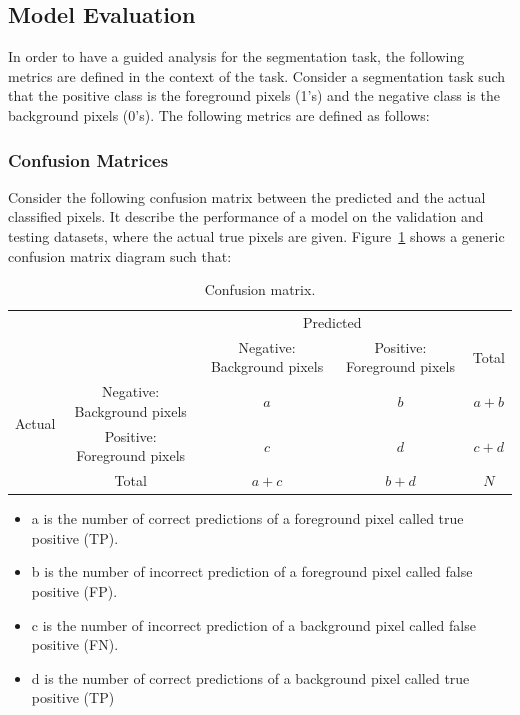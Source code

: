 \documentclass{WitsPhysicsReport}
\begin{document}
\subsection{Model Evaluation}
\label{sec:model_evaluation_and_optimization}
 In order to have a guided analysis for the segmentation task, the following metrics are defined in the context of the task. Consider a segmentation task such that the positive class is the foreground pixels (1's) and the negative class is the background pixels (0's). The following metrics are defined as follows:



\subsubsection{Confusion Matrices}
Consider the following confusion matrix between the predicted and the actual classified pixels. It describe the performance of a model on the validation and testing datasets, where the actual true pixels are given. Figure~\ref{fig:confusion_matrix} shows a  generic confusion matrix diagram such that:
\begin{table}[H]
\centering
    \begin{tabularx}{\textwidth}{c|c|c|c|c} 
        \multicolumn{2}{c}{}&\multicolumn{2}{c}{Predicted}&\\
        \cline{3-4}
        \multicolumn{2}{c|}{}& \small Negative: Background pixels & \small Positive: Foreground pixels & \multicolumn{1}{c}{Total}\\
        \cline{2-4}
        \multirow{2}{*}{Actual}& \small Negative: Background pixels & $a$ & $b$ & $a+b$\\
        \cline{2-4}
        & \small Positive: Foreground pixels & $c$ & $d$ & $c+d$\\
        \cline{2-4}
        \multicolumn{1}{c}{} & \multicolumn{1}{c}{Total} & \multicolumn{1}{c}{$a+c$} & \multicolumn{    1}{c}{$b+d$} & \multicolumn{1}{c}{$N$}\\
    \end{tabularx}
    \caption{Confusion matrix.}
    \label{fig:confusion_matrix}%
\end{table}


\begin{itemize}
    \item a is the number of correct predictions of a foreground pixel called true positive (TP).
    \item b is the number of incorrect prediction of a foreground pixel called false positive (FP).
    \item c is the number of incorrect prediction of a background pixel called false positive (FN).
    \item d is the number of correct predictions of a background pixel called true positive (TP)
\end{itemize}
\end{document}
